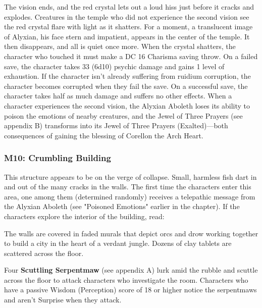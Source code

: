 \documentclass[10pt,a4,twoside,twocolumn,openany,nodeprecatedcode]{dndbook}
\begin{document}
The vision ends, and the red crystal lets out a loud hiss just before it cracks and explodes. Creatures in the temple who did not experience the second vision see the red crystal flare with light as it shatters. For a moment, a translucent image of Alyxian, his face stern and impatient, appears in the center of the temple. It then disappears, and all is quiet once more.
When the crystal shatters, the character who touched it must make a DC 16 Charisma saving throw. On a failed save, the character takes 33 (6d10) psychic damage and gains 1 level of exhaustion. If the character isn't already suffering from ruidium corruption, the character becomes corrupted when they fail the save. On a successful save, the character takes half as much damage and suffers no other effects.
When a character experiences the second vision, the Alyxian Aboleth loses its ability to poison the emotions of nearby creatures, and the Jewel of Three Prayers (see appendix B) transforms into its Jewel of Three Prayers (Exalted)—both consequences of gaining the blessing of Corellon the Arch Heart.
\subsubsection{M10: Crumbling Building}
This structure appears to be on the verge of collapse. Small, harmless fish dart in and out of the many cracks in the walls.
The first time the characters enter this area, one among them (determined randomly) receives a telepathic message from the Alyxian Aboleth (see "Poisoned Emotions" earlier in the chapter).
If the characters explore the interior of the building, read:
\begin{DndReadAloud}{}
The walls are covered in faded murals that depict orcs and drow working together to build a city in the heart of a verdant jungle. Dozens of clay tablets are scattered across the floor.
\end{DndReadAloud}

Four \textbf{Scuttling Serpentmaw} (see appendix A) lurk amid the rubble and scuttle across the floor to attack characters who investigate the room. Characters who have a passive Wisdom (Perception) score of 18 or higher notice the serpentmaws and aren't Surprise when they attack.
\end{document}
